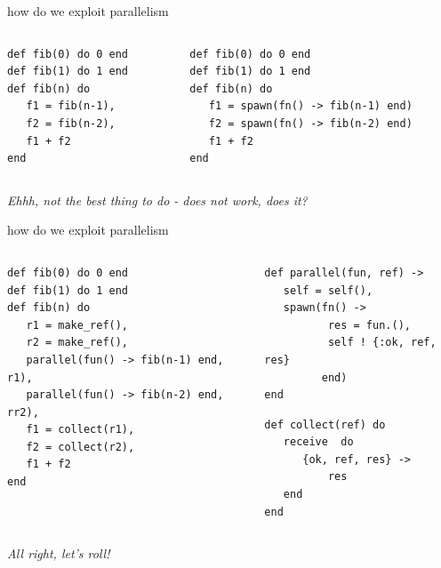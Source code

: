 \begin{frame}[fragile]{how do we exploit parallelism}

\begin{columns}
 \begin{column}{0.5\linewidth}
\begin{verbatim}
def fib(0) do 0 end
def fib(1) do 1 end
def fib(n) do
   f1 = fib(n-1),
   f2 = fib(n-2),
   f1 + f2
end
\end{verbatim}
 \end{column}
\pause
 \begin{column}{0.5\linewidth}
\begin{verbatim}
def fib(0) do 0 end
def fib(1) do 1 end
def fib(n) do
   f1 = spawn(fn() -> fib(n-1) end)
   f2 = spawn(fn() -> fib(n-2) end)
   f1 + f2
end
\end{verbatim}
 \end{column}
\end{columns}

\pause\vspace{20pt}
{\em Ehhh, not the best thing to do - does not work, does it?}

\end{frame}


\begin{frame}[fragile]{how do we exploit parallelism}

\begin{columns}
 \begin{column}{0.6\linewidth}
 \begin{verbatim}
def fib(0) do 0 end
def fib(1) do 1 end
def fib(n) do
   r1 = make_ref(),
   r2 = make_ref(),
   parallel(fun() -> fib(n-1) end, r1),
   parallel(fun() -> fib(n-2) end, rr2),
   f1 = collect(r1),
   f2 = collect(r2),
   f1 + f2
end
\end{verbatim}
 \end{column}
\pause
 \begin{column}{0.4\linewidth}
\begin{verbatim}
def parallel(fun, ref) ->
   self = self(),
   spawn(fn() -> 
          res = fun.(), 
          self ! {:ok, ref, res}
         end)
end 
\end{verbatim}
\begin{verbatim}
def collect(ref) do
   receive  do
      {ok, ref, res} ->
          res
   end
end
\end{verbatim}
 \end{column}
\end{columns}

\pause\vspace{20pt}
{\em All right, let's roll!}

\end{frame}

